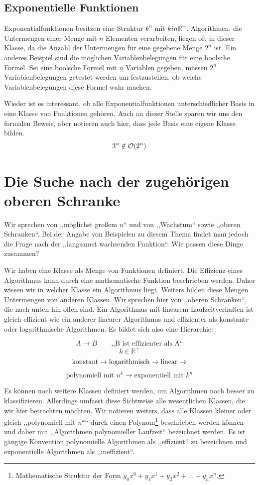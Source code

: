 \subsection{Exponentielle Funktionen}
%
Exponentialfunktionen besitzen eine Struktur $k^n$ mit $k in \mathbb{R}^+$. Algorithmen, die Untermengen einer Menge mit $n$ Elementen verarbeiten, liegen oft in dieser Klasse, da die Anzahl der Untermengen für eine gegebene Menge $2^n$ ist. Ein anderes Beispiel sind die möglichen Variablenbelegungen für eine boolsche Formel. Sei eine boolsche Formel mit $n$ Variablen gegeben, müssen $2^n$ Variablenbelegungen getestet werden um festzustellen, ob welche Variablenbelegungen diese Formel wahr machen.

Wieder ist es interessant, ob alle Exponentialfunktionen unterschiedlicher Basis in eine Klasse von Funktionen gehören. Auch an dieser Stelle sparen wir uns den formalen Beweis, aber notieren auch hier, dass jede Basis eine eigene Klasse bilden.
\[
  3^n \notin \mathcal{O}\!\left(2^n\right)
\]
%
\section{Die Suche nach der zugehörigen oberen Schranke}
%
Wir sprechen von ,,möglichst großem $n$`` und von ,,Wachstum`` sowie ,,oberen Schranken``. Bei der Angabe von Beispielen zu diesem Thema findet man jedoch die Frage nach der ,,langsamst wachsenden Funktion``. Wie passen diese Dinge zusammen?

Wir haben eine Klasse als Menge von Funktionen definiert. Die Effizienz eines Algorithmus kann durch eine mathematische Funktion beschrieben werden. Daher wissen wir in welcher Klasse ein Algorithmus liegt. Weiters bilden diese Mengen Untermengen von anderen Klassen. Wir sprechen hier von ,,oberen Schranken``, die nach unten hin offen sind. Ein Algorithmus mit linearem Laufzeitverhalten ist gleich effizient wie ein anderer linearer Algorithmus und effizienter als konstante oder logarithmische Algorithmen. Es bildet sich also eine Hierarchie:

\[
  A \rightarrow B \qquad \text{,,B ist effizienter als A``}
\] \[
  k \in \mathbb{R}^+
\] \[
  \text{konstant} \rightarrow
  \text{logarithmisch} \rightarrow
  \text{linear} \rightarrow
  \vspace{-8pt}
\] \[
  \text{polynomiell mit $n^k$} \rightarrow
  \text{exponentiell mit $k^n$}
\]

Es können noch weitere Klassen definiert werden, um Algorithmen noch besser zu klassifizieren. Allerdings umfasst diese Sichtweise alle wesentlichen Klassen, die wir hier betrachten möchten. Wir notieren weiters, dass alle Klassen kleiner oder gleich ,,polynomiell mit $n^k$`` durch einen Polynom\footnote{Mathematische Struktur der Form $y_0x^0 + y_1x^1 + y_2x^2 + \ldots + y_nx^n$.} beschrieben werden können und daher mit ,,Algorithmen polynomieller Laufzeit`` bezeichnet werden. Es ist gängige Konvention polynomielle Algorithmen als ,,effizient`` zu bezeichnen und exponentielle Algorithmen als ,,ineffizient``.

